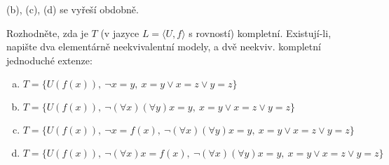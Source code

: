 \begin{problem}
\begin{solution}
        (b), (c), (d) se vyřeší obdobně. 
                    
    \end{solution}

\end{problem}


\begin{problem}

    Rozhodněte, zda je $T$ (v jazyce $L = \langle U, f \rangle$ s rovností) kompletní. Existují-li, napište dva elementárně neekvivalentní modely, a dvě neekviv. kompletní jednoduché extenze:
    \begin{enumerate}[(a)]
        \item  $T = \{U(f(x)),\ \neg x=y,\ x=y\vee x=z\vee y=z\}$
        \item $T = \{U(f(x)),\ \neg (\forall x)(\forall y)x=y,\ x=y\vee x=z\vee y=z\}$
        \item  $T = \{U(f(x)),\ \neg x=f(x),\ \neg (\forall x)(\forall y)x=y,\ x=y\vee x=z\vee y=z\}$
        \item  $T = \{U(f(x)),\ \neg (\forall x) x=f(x),\ \neg (\forall x)(\forall y)x=y,\ x=y\vee x=z\vee y=z\}$
    \end{enumerate}


\end{problem}
